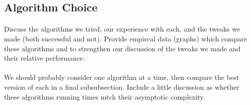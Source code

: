 \subsection{Algorithm Choice}
\label{sec:deep:algchoice}
\paragraph{}
Discuss the algorithms we tried, our experience with each, and the tweaks we
made (both successful and not).  Provide empircal data (graphs) which compare
these algorithms and to strengthen our discussion of the tweaks we made and
their relative performance.

\paragraph{}
We should probably consider one algorithm at a time, then compare the best
version of each in a final subsubsection.  Include a little discussion as
whether these algorithms running times mtch their asymptotic complexity.
